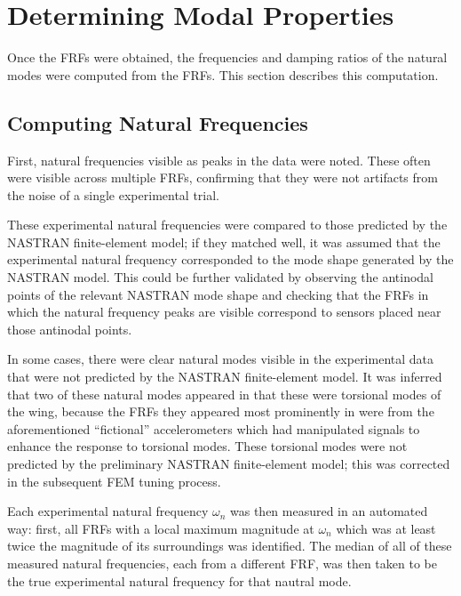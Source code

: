 \section{Determining Modal Properties} %

Once the FRFs were obtained, the frequencies and damping ratios of the natural modes were computed from the FRFs. This section describes this computation.

\subsection{Computing Natural Frequencies}

First, natural frequencies visible as peaks in the data were noted. These often were visible across multiple FRFs, confirming that they were not artifacts from the noise of a single experimental trial.

These experimental natural frequencies were compared to those predicted by the NASTRAN finite-element model; if they matched well, it was assumed that the experimental natural frequency corresponded to the mode shape generated by the NASTRAN model. This could be further validated by observing the antinodal points of the relevant NASTRAN mode shape and checking that the FRFs in which the natural frequency peaks are visible correspond to sensors placed near those antinodal points.

In some cases, there were clear natural modes visible in the experimental data that were not predicted by the NASTRAN finite-element model. It was inferred that two of these natural modes appeared in that these were torsional modes of the wing, because the FRFs they appeared most prominently in were from the aforementioned ``fictional'' accelerometers which had manipulated signals to enhance the response to torsional modes. These torsional modes were not predicted by the preliminary NASTRAN finite-element model; this was corrected in the subsequent FEM tuning process.

Each experimental natural frequency $\omega_n$ was then measured in an automated way: first, all FRFs with a local maximum magnitude at $\omega_n$ which was at least twice the magnitude of its surroundings was identified. The median of all of these measured natural frequencies, each from a different FRF, was then taken to be the true experimental natural frequency for that nautral mode.


